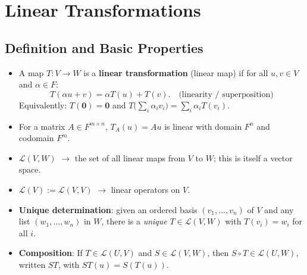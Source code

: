 \documentclass[hidelinks]{article}
\begin{document}
\section{Linear Transformations}

\subsection{Definition and Basic Properties}
\begin{itemize}
    \item A map $T: V \rightarrow W$ is a \textbf{linear transformation} (linear map) if for all $u, v\in V$ and $\alpha\in F$:
    \[
        T(\alpha u + v) = \alpha T(u) + T(v). \quad\text{(linearity / superposition)}
    \]
    Equivalently: $T(\mathbf{0}) = \mathbf{0}$ and $T\!\bigl(\sum_i \alpha_i v_i\bigr) = \sum_i \alpha_i T(v_i)$.
    \item For a matrix $A \in F^{m\times n}$, $T_A(u) = Au$ is linear with domain $F^n$ and codomain $F^m$.
    \item $\mathcal{L}(V, W)$ $\rightarrow$ the set of all linear maps from $V$ to $W$; this is itself a vector space.
    \item $\mathcal{L}(V) := \mathcal{L}(V,V)$ $\rightarrow$ linear operators on $V$.
    \item \textbf{Unique determination}: given an ordered basis $(v_1,\ldots,v_n)$ of $V$ and any list $(w_1,\ldots,w_n)$ in $W$, there is a \emph{unique} $T\in\mathcal{L}(V,W)$ with $T(v_i)=w_i$ for all $i$.
    \item \textbf{Composition}: If $T\in\mathcal{L}(U,V)$ and $S\in\mathcal{L}(V,W)$, then $S\circ T\in\mathcal{L}(U,W)$, written $ST$, with $ST(u)=S(T(u))$.
\end{itemize}
\end{document}
